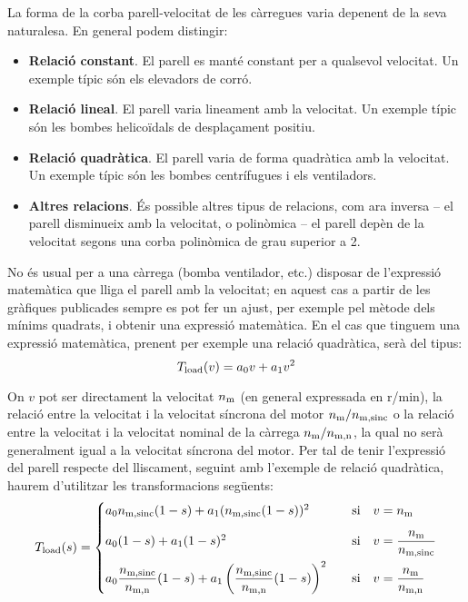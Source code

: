 La forma de la corba parell-velocitat de les càrregues varia depenent de la seva naturalesa. En general podem distingir:
\begin{itemize}
	\item  \textbf{Relació constant}. El parell es manté constant per a qualsevol velocitat. Un exemple típic són els elevadors de corró.
	
	\item  \textbf{Relació lineal}. El parell varia lineament amb la velocitat. Un exemple típic són les bombes helicoïdals de desplaçament positiu.
	
	\item  \textbf{Relació quadràtica}. El parell varia de forma  quadràtica  amb la velocitat. Un exemple típic són les bombes centrífugues i els ventiladors.
	
	\item  \textbf{Altres relacions}. És possible altres tipus de relacions, com ara inversa -- el parell disminueix amb la velocitat, o polinòmica -- el parell depèn de la velocitat segons una corba polinòmica de grau superior a 2.
\end{itemize}

No és  usual per a una càrrega (bomba ventilador, etc.) disposar de l'expressió matemàtica que lliga el parell amb la velocitat; en aquest cas a partir de les gràfiques publicades sempre es pot fer un ajust, per exemple pel mètode dels mínims quadrats, i obtenir una expressió matemàtica. En el cas que tinguem una expressió matemàtica, prenent per exemple una relació quadràtica, serà del tipus:
\begin{equation}
	T_\mathrm{load}(v) = a_0 v + a_1 v^2
\end{equation}

On $v$ pot ser directament la velocitat $n_\mathrm{m}$ (en general expressada en r/min),  la relació entre la velocitat i la velocitat síncrona del motor $n_\mathrm{m}/n_\mathrm{m,sinc}$ o la relació entre la velocitat i la velocitat nominal de la càrrega $n_\mathrm{m}/n_\mathrm{m,n}$, la qual no serà generalment igual a la velocitat síncrona del motor. Per tal de tenir l'expressió del parell respecte del lliscament,  seguint amb l'exemple de relació quadràtica, haurem d'utilitzar les transformacions següents:
\begin{equation}\label{eq:Tload-v-s}
	T_\mathrm{load}(s) = \begin{cases}
		 a_0 n_\mathrm{m,sinc}(1-s) + a_1 (n_\mathrm{m,sinc}(1-s))^2  & \quad\text{si}\quad v=n_\mathrm{m}  \\[2ex]
		a_0 (1-s) + a_1 (1-s)^2 & \quad\text{si}\quad  v =\dfrac{n_\mathrm{m}}{n_\mathrm{m,sinc}} \\[2ex]
		 a_0 \dfrac{n_\mathrm{m,sinc}}{n_\mathrm{m,n}}(1-s) + a_1 \left(\dfrac{n_\mathrm{m,sinc}}{n_\mathrm{m,n}}(1-s)\right)^2 &   \quad\text{si}\quad v = \dfrac{n_\mathrm{m}}{n_\mathrm{m,n}}
	\end{cases}
\end{equation}


